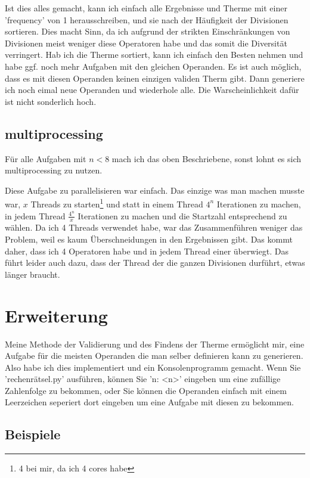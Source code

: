 \documentclass[a4paper,10pt,ngerman]{scrartcl}
\begin{document}
Ist dies alles gemacht, kann ich einfach alle Ergebnisse und Therme mit einer 'frequency' von 1 herausschreiben, und sie nach der Häufigkeit der Divisionen sortieren. Dies macht Sinn, da ich aufgrund der strikten Einschränkungen von Divisionen meist weniger diese Operatoren habe und das somit die Diversität verringert. Hab ich die Therme sortiert, kann ich einfach den Besten nehmen und habe ggf. noch mehr Aufgaben mit den gleichen Operanden. Es ist auch möglich, dass es mit diesen Operanden keinen einzigen validen Therm gibt. Dann generiere ich noch eimal neue Operanden und wiederhole alle. Die Warscheinlichkeit dafür ist nicht sonderlich hoch.

\subsection{multiprocessing}

Für alle Aufgaben mit $n < 8$ mach ich das oben Beschriebene, sonst lohnt es sich multiprocessing zu nutzen.

Diese Aufgabe zu parallelisieren war einfach. Das einzige was man machen musste war, $x$ Threads zu starten\footnote{4 bei mir, da ich 4 cores habe} und statt in einem Thread $4^n$ Iterationen zu machen, in jedem Thread $\frac{4^n}{x}$ Iterationen zu machen und die Startzahl entsprechend zu wählen. Da ich 4 Threads verwendet habe, war das Zusammenführen weniger das Problem, weil es kaum Überschneidungen in den Ergebnissen gibt. Das kommt daher, dass ich 4 Operatoren habe und in jedem Thread einer überwiegt. Das führt leider auch dazu, dass der Thread der die ganzen Divisionen durführt, etwas länger braucht.


\section{Erweiterung}

Meine Methode der Validierung und des Findens der Therme ermöglicht mir, eine Aufgabe für die meisten Operanden die man selber definieren kann zu generieren. Also habe ich dies implementiert und ein Konsolenprogramm gemacht. Wenn Sie 'rechenrätsel.py' ausführen, können Sie 'n: <n>' eingeben um eine zufällige Zahlenfolge zu bekommen, oder Sie können die Operanden einfach mit einem Leerzeichen seperiert dort eingeben um eine Aufgabe mit diesen zu bekommen.

\subsection{Beispiele}
\end{document}
